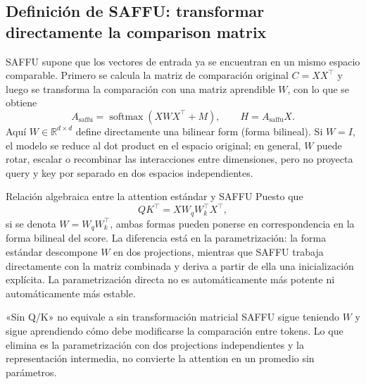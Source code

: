 \subsection{Definición de SAFFU: transformar directamente la comparison matrix}

SAFFU supone que los vectores de entrada ya se encuentran en un mismo espacio comparable. Primero se calcula la matriz de comparación original $C=XX^\top$ y luego se transforma la comparación con una matriz aprendible $W$, con lo que se obtiene
\[
A_{\text{saffu}}=\operatorname{softmax}(XWX^\top+M),
\qquad H=A_{\text{saffu}}X.
\]
Aquí $W\in\mathbb{R}^{d\times d}$ define directamente una bilinear form (forma bilineal). Si $W=I$, el modelo se reduce al dot product en el espacio original; en general, $W$ puede rotar, escalar o recombinar las interacciones entre dimensiones, pero no proyecta query y key por separado en dos espacios independientes.


\begin{importantbox}{Relación algebraica entre la attention estándar y SAFFU}
Puesto que
\[
QK^\top=XW_qW_k^\top X^\top,
\]
si se denota $W=W_qW_k^\top$, ambas formas pueden ponerse en correspondencia en la forma bilineal del score. La diferencia está en la parametrización: la forma estándar descompone $W$ en dos projections, mientras que SAFFU trabaja directamente con la matriz combinada y deriva a partir de ella una inicialización explícita. La parametrización directa no es automáticamente más potente ni automáticamente más estable.
\end{importantbox}

\begin{warningbox}{«Sin Q/K» no equivale a sin transformación matricial}
SAFFU sigue teniendo $W$ y sigue aprendiendo cómo debe modificarse la comparación entre tokens. Lo que elimina es la parametrización con dos projections independientes y la representación intermedia, no convierte la attention en un promedio sin parámetros.
\end{warningbox}


